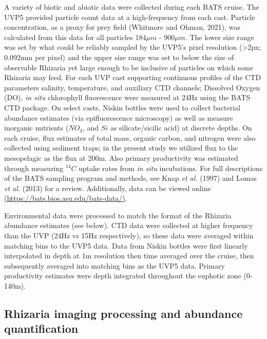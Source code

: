 \documentclass[
]{article}
\begin{document}
A variety of biotic and abiotic data were collected during each BATS
cruise. The UVP5 provided particle count data at a high-frequency from
each cast. Particle concentration, as a proxy for prey field (Whitmore
and Ohman, 2021), was calculated from this data for all particles
184\(\mu m\) - 900\(\mu m\). The lower size range was set by what could
be reliably sampled by the UVP5's pixel resolution (\textgreater2px;
0.092mm per pixel) and the upper size range was set to below the size of
observable Rhizaria yet large enough to be inclusive of particles on
which some Rhizaria may feed. For each UVP cast supporting continuous
profiles of the CTD parameters salinity, temperature, and auxiliary CTD
channels; Dissolved Oxygen (DO), \emph{in situ} chlorophyll fluorescence
were measured at 24Hz using the BATS CTD package. On select casts,
Niskin bottles were used to collect bacterial abundance estimates (via
epifluorescence microscopy) as well as measure inorganic nutrients
(\(NO_3\), and \(Si\) as silicate/sicilic acid) at discrete depths. On
each cruise, flux estimates of total mass, organic carbon, and nitrogen
were also collected using sediment traps; in the present study we
utilized flux to the mesopelagic as the flux at 200m. Also primary
productivity was estimated through measuring \(^{14}C\) uptake rates
from \emph{in situ} incubations. For full descriptions of the BATS
sampling program and methods, see Knap \emph{et al.} (1997) and Lomas
\emph{et al.} (2013) for a review. Additionally, data can be viewed
online
\href{https://bats.bios.asu.edu/bats-data/}{(https://bats.bios.asu.edu/bats-data/)}.

Environmental data were processed to match the format of the Rhizaria
abundance estimates (see below). CTD data were collected at higher
frequency than the UVP (24Hz vs 15Hz respectively), so these data were
averaged within matching bins to the UVP5 data. Data from Niskin bottles
were first linearly interpolated in depth at 1m resolution then time
averaged over the cruise, then subsequently averaged into matching bins
as the UVP5 data. Primary productivity estimates were depth integrated
throughout the euphotic zone (0-140m).

\hypertarget{rhizaria-imaging-processing-and-abundance-quantification}{%
\subsection{Rhizaria imaging processing and abundance
quantification}\label{rhizaria-imaging-processing-and-abundance-quantification}}
\end{document}
